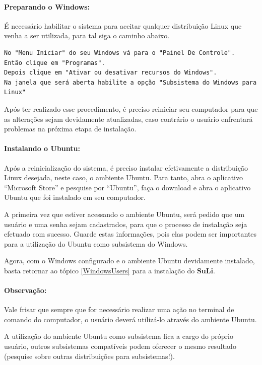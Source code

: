 \documentclass[12pt, a4paper]{article}
\newcommand{\red}{\textcolor{red}}
\newcommand{\SL}{{\bf SuLi}}
\begin{document}
\paragraph{Preparando o Windows:} É necessário habilitar o sistema para aceitar qualquer distribuição Linux que venha a ser utilizada, para tal siga o caminho abaixo.

\begin{verbatim}
No "Menu Iniciar" do seu Windows vá para o "Painel De Controle".
Então clique em "Programas".
Depois clique em "Ativar ou desativar recursos do Windows".
Na janela que será aberta habilite a opção "Subsistema do Windows para Linux"
\end{verbatim}
Após ter realizado esse procedimento, é preciso reiniciar seu computador para que as alterações sejam devidamente atualizadas, caso contrário o usuário enfrentará problemas na próxima etapa de instalação.



\paragraph{Instalando o Ubuntu:} Após a reinicialização do sistema, é preciso instalar efetivamente a distribuição Linux desejada, neste caso, o ambiente Ubuntu. Para tanto, abra o aplicativo ``Microsoft Store'' e pesquise por ``Ubuntu'', faça o download e abra o aplicativo Ubuntu que foi instalado em seu computador.

A primeira vez que estiver acessando o ambiente Ubuntu, será pedido que um usuário e uma senha sejam cadastrados, para que o processo de instalação seja efetuado com sucesso. Guarde estas informações, pois elas podem ser importantes para a utilização do Ubuntu como subsistema do Windows.

Agora, com o Windows configurado e o ambiente Ubuntu devidamente instalado, basta retornar ao tópico \ref{WindowsUsers} para a instalação do \SL. 

\paragraph{Observação:} Vale frisar que sempre que for necessário realizar uma ação no terminal de comando do computador, o usuário deverá utilizá-lo através do ambiente Ubuntu.

A utilização do ambiente Ubuntu como subsistema fica a cargo do próprio usuário, outros subsistemas compatíveis podem oferecer o mesmo resultado (pesquise sobre outras distribuições para subsistemas!).


\newpage


\end{document}
